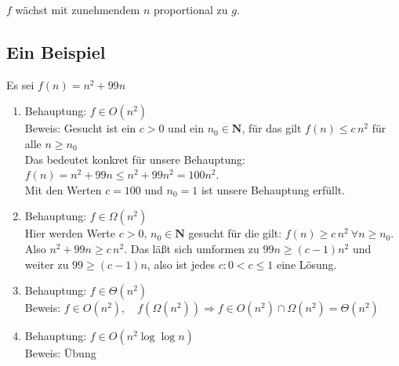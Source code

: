 \documentclass{scrreprt}%
\theoremstyle{break}
\begin{document}
$f$ wächst mit zunehmendem $n$ proportional zu $g$.

%
%

\subsection{Ein Beispiel}
Es sei $f(n) = n^2+99n$

\begin{enumerate}
\item   Behauptung: $f \in O(n^2)$\\
        Beweis: Gesucht ist ein $c>0$ und ein $n_0 \in \mathbf{N}$, für das gilt $f(n)\leq c\, n^2 $ 
        für alle $n\geq n_0$\\
        Das bedeutet konkret für unsere Behauptung:\\
        $f(n)= n^2+99n \leq n^2+99n^2 =100 n^2$.\\
        Mit den Werten $c=100$ und $n_0 = 1$ ist unsere Behauptung erfüllt.

\item   Behauptung: $f \in \Omega(n^2)$\\
        Hier werden Werte $c>0, \, n_0 \in \mathbf{N}$ gesucht für die gilt: $f(n) \geq c\, n^2 \ \forall n\geq n_0$. Also $n^2+99n \geq
        c\, n^2$. Das läßt sich umformen zu $99n \geq (c-1)n^2$ und weiter zu $99 \geq (c-1)n$, also ist jedes $c: 0<c \leq 1$ eine
        Lösung.

\item   Behauptung: $f \in \Theta(n^2)$\\
        Beweis: $f \in O(n^2), \quad f(\Omega(n^2)) \Rightarrow f \in O(n^2)\cap \Omega(n^2)=\Theta(n^2)$

\item   Behauptung: $f \in O(n^2 \log\log n)$\\
        Beweis: Übung
\end{enumerate}
\end{document}
